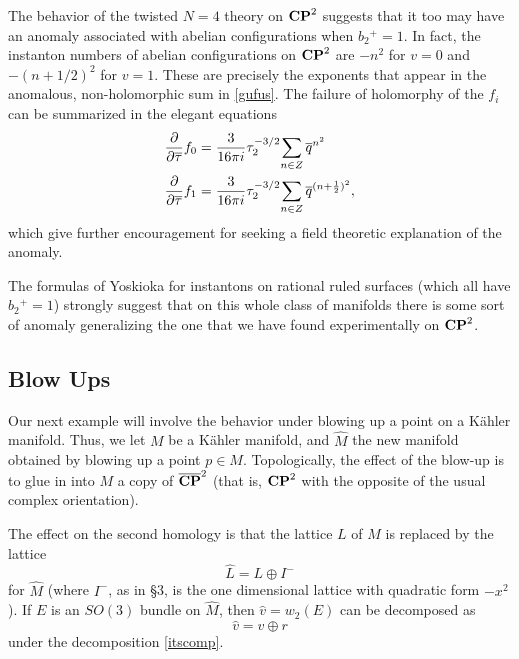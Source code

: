 \documentclass[12pt]{article}
\numberwithin{equation}{section}
\def\bar{\overline}
\begin{document}
The behavior of the twisted $N=4$ theory on ${\bf CP}^2$ suggests that
it too may have an anomaly associated with abelian configurations
when $b_2{}^+=1$.  In fact, the instanton numbers of abelian
configurations on ${\bf CP}^2$ are $-n^2$ for $v=0$ and
$-(n+1/2)^2$ for $v=1$.
These are precisely the exponents that appear in the anomalous,
non-holomorphic sum in \eqref{gufus}.
The failure of holomorphy of the $f_i$ can be summarized in the
elegant equations
\begin{equation}
  \label{anom}
  \begin{aligned} {\partial\over \partial\bar \tau} f_0&={3\over 16
    \pi i}\tau_2^{-3/2} {\sum_{n\in Z}{\bar q}^{ n
    ^2}}\\ {\partial\over \partial\bar \tau} f_1&={3\over 16 \pi
    i}\tau_2^{-3/2} {\sum_{n\in Z}{\bar q}^{ (n+{1\over 2})^2}},\\
  \end{aligned}
\end{equation}
which give further encouragement for seeking a field theoretic
explanation of the anomaly.

The formulas of Yoskioka \cite{yoshi}
for instantons on rational ruled surfaces (which all have $b_2{}^+=1$) strongly
suggest that on this whole class of manifolds there is some sort of
anomaly generalizing the one that we have found experimentally
on ${\bf CP}^2$.

\subsection{Blow Ups}

Our next example will involve the behavior under blowing
up a point on a K\"ahler manifold.  Thus, we let $M$ be
a K\"ahler manifold, and $\hat M$ the new manifold obtained
by blowing up a point $p\in M$.  Topologically, the effect of the
blow-up is to glue in into $M$ a copy of $\overline{{\bf CP}}^2$ (that is,
${\bf CP}^2$ with the opposite of the usual complex orientation).

The effect on the second homology is that the lattice $L$ of $M$
is replaced by the lattice
\begin{equation}
  \label{itscomp}
  \hat L= L \oplus I^-
\end{equation}
for $\hat M$
(where $I^-$, as in \S3,
is the one dimensional lattice with quadratic form $-x^2$).
If $E$ is an $SO(3)$ bundle on $\hat M$, then $\hat v=w_2(E)$
can be decomposed as
\begin{equation}
  \label{jimcon}
  \hat v= v\oplus r
\end{equation}
under the decomposition
\eqref{itscomp}.
\end{document}
